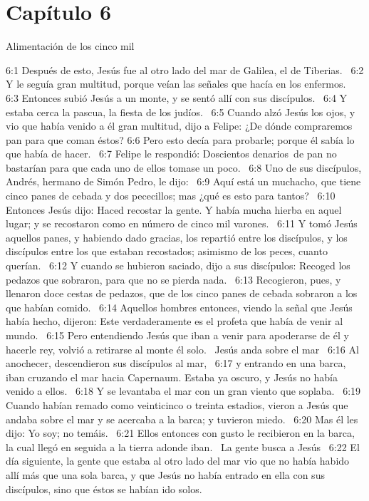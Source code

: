 \section*{Capítulo 6}
Alimentación de los cinco mil   

6:1 Después de esto, Jesús fue al otro lado del mar de Galilea, el de Tiberias.  
6:2 Y le seguía gran multitud, porque veían las señales que hacía en los enfermos.  
6:3 Entonces subió Jesús a un monte, y se sentó allí con sus discípulos.  
6:4 Y estaba cerca la pascua, la fiesta de los judíos.  
6:5 Cuando alzó Jesús los ojos, y vio que había venido a él gran multitud, dijo a Felipe: ¿De dónde compraremos pan para que coman éstos? 
6:6 Pero esto decía para probarle; porque él sabía lo que había de hacer.  
6:7 Felipe le respondió: Doscientos denarios de pan no bastarían para que cada uno de ellos tomase un poco.  
6:8 Uno de sus discípulos, Andrés, hermano de Simón Pedro, le dijo:  
6:9 Aquí está un muchacho, que tiene cinco panes de cebada y dos pececillos; mas ¿qué es esto para tantos?  
6:10 Entonces Jesús dijo: Haced recostar la gente. Y había mucha hierba en aquel lugar; y se recostaron como en número de cinco mil varones.  
6:11 Y tomó Jesús aquellos panes, y habiendo dado gracias, los repartió entre los discípulos, y los discípulos entre los que estaban recostados; asimismo de los peces, cuanto querían.  
6:12 Y cuando se hubieron saciado, dijo a sus discípulos: Recoged los pedazos que sobraron, para que no se pierda nada.  
6:13 Recogieron, pues, y llenaron doce cestas de pedazos, que de los cinco panes de cebada sobraron a los que habían comido.  
6:14 Aquellos hombres entonces, viendo la señal que Jesús había hecho, dijeron: Este verdaderamente es el profeta que había de venir al mundo.  
6:15 Pero entendiendo Jesús que iban a venir para apoderarse de él y hacerle rey, volvió a retirarse al monte él solo.  
Jesús anda sobre el mar  
6:16 Al anochecer, descendieron sus discípulos al mar,  
6:17 y entrando en una barca, iban cruzando el mar hacia Capernaum. Estaba ya oscuro, y Jesús no había venido a ellos.  
6:18 Y se levantaba el mar con un gran viento que soplaba.  
6:19 Cuando habían remado como veinticinco o treinta estadios, vieron a Jesús que andaba sobre el mar y se acercaba a la barca; y tuvieron miedo.  
6:20 Mas él les dijo: Yo soy; no temáis.  
6:21 Ellos entonces con gusto le recibieron en la barca, la cual llegó en seguida a la tierra adonde iban.  
La gente busca a Jesús  
6:22 El día siguiente, la gente que estaba al otro lado del mar vio que no había habido allí más que una sola barca, y que Jesús no había entrado en ella con sus discípulos, sino que éstos se habían ido solos.  
